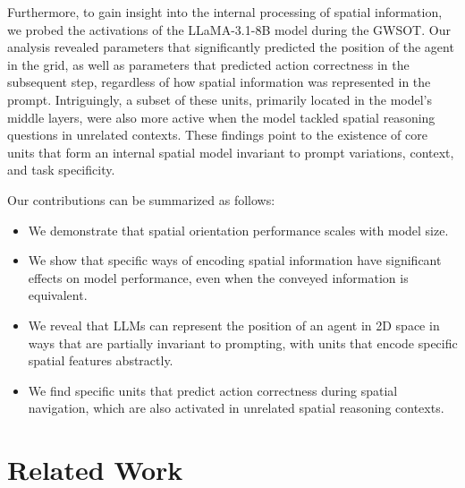 \documentclass[runningheads]{llncs}
\begin{document}
Furthermore, to gain insight into the internal processing of spatial information, we probed the activations of the LLaMA-3.1-8B model during the GWSOT. Our analysis revealed parameters that significantly predicted the position of the agent in the grid, as well as parameters that predicted action correctness in the subsequent step, regardless of how spatial information was represented in the prompt. Intriguingly, a subset of these units, primarily located in the model’s middle layers, were also more active when the model tackled spatial reasoning questions in unrelated contexts. These findings point to the existence of core units that form an internal spatial model invariant to prompt variations, context, and task specificity.

Our contributions can be summarized as follows:

\begin{samepage} %
\begin{itemize}[label={\scalebox{1}{$\bullet$}}, leftmargin=*] %
    \item We demonstrate that spatial orientation performance scales with model size.
    \item We show that specific ways of encoding spatial information have significant effects on model performance, even when the conveyed information is equivalent.
    \item We reveal that LLMs can represent the position of an agent in 2D space in ways that are partially invariant to prompting, with units that encode specific spatial features abstractly.
    \item We find specific units that predict action correctness during spatial navigation, which are also activated in unrelated spatial reasoning contexts.
\end{itemize}
\end{samepage}


\section{Related Work}
\end{document}
